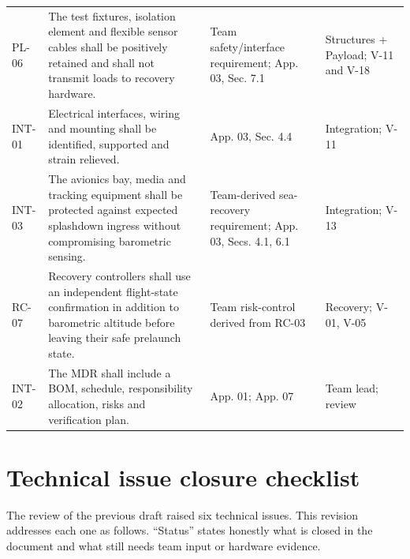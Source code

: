 \begin{longtable}{@{}L{12mm}L{71mm}L{33mm}L{34mm}@{}}
PL-06 & The test fixtures, isolation element and flexible sensor cables shall be positively retained and shall not transmit loads to recovery hardware. & Team safety/interface requirement; App. 03, Sec. 7.1 & Structures + Payload; V-11 and V-18\\
INT-01 & Electrical interfaces, wiring and mounting shall be identified, supported and strain relieved. & App. 03, Sec. 4.4 & Integration; V-11\\
INT-03 & The avionics bay, media and tracking equipment shall be protected against expected splashdown ingress without compromising barometric sensing. & Team-derived sea-recovery requirement; App. 03, Secs. 4.1, 6.1 & Integration; V-13\\
RC-07 & Recovery controllers shall use an independent flight-state confirmation in addition to barometric altitude before leaving their safe prelaunch state. & Team risk-control derived from RC-03 & Recovery; V-01, V-05\\
INT-02 & The MDR shall include a BOM, schedule, responsibility allocation, risks and verification plan. & App. 01; App. 07 \cite{rtc2027app01,rtc2027app07} & Team lead; review\\
\end{longtable}
\endgroup %
\normalsize

\section{Technical issue closure checklist}
The review of the previous draft raised six technical issues. This revision addresses each one as follows. ``Status'' states honestly what is closed in the document and what still needs team input or hardware evidence.

